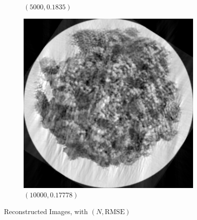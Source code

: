 \documentclass[a4paper, landscape]{article}
\begin{document}
\begin{figure}[H]
\begin{subfigure}{0.13\linewidth}
		\caption{$(5000, 0.1835)$}
	\end{subfigure}
	\begin{subfigure}{0.13\linewidth}
		\centering
		\includegraphics[width=\linewidth]{results/cryoem, N = 10000.png}
		\caption{$(10000, 0.17778)$}
	\end{subfigure}
	\caption{Reconstructed Images, with $(N, \text{RMSE})$}
	\label{fig:ri}
\end{figure}
\end{document}
